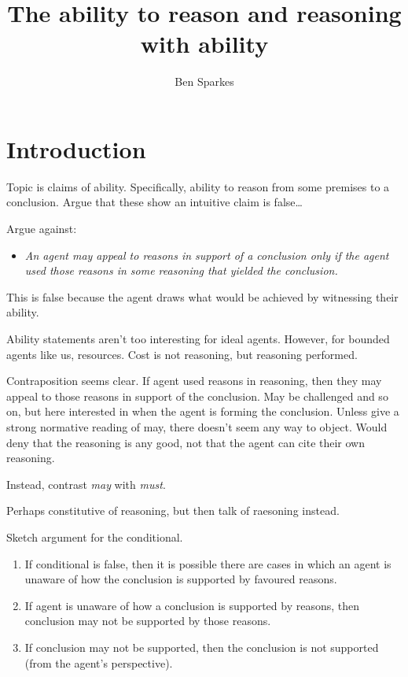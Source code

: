 \documentclass[10pt]{article}
\title{The ability to reason and reasoning with ability}
\author{Ben Sparkes}
\begin{document}
\tableofcontents

\newpage

\maketitle

\section{Introduction}
\label{sec:introduction-1}


{
  \color{red}
  Topic is claims of ability.
  Specifically, ability to reason from some premises to a conclusion.
  Argue that these show an intuitive claim is false\dots
}

Argue against:
\begin{itemize}
\item\label{denied-claim} \emph{An agent may appeal to reasons in support of a conclusion only if the agent used those reasons in some reasoning that yielded the conclusion.}
\end{itemize}

{
  \color{red}
  This is false because the agent draws what would be achieved by witnessing their ability.
}

{
  \color{red}
  Ability statements aren't too interesting for ideal agents.
  However, for bounded agents like us, resources.
  Cost is not reasoning, but reasoning performed.
}

Contraposition seems clear.
If agent used reasons in reasoning, then they may appeal to those reasons in support of the conclusion.
May be challenged and so on, but here interested in when the agent is forming the conclusion.
Unless give a strong normative reading of may, there doesn't seem any way to object.
Would deny that the reasoning is any good, not that the agent can cite their own reasoning.

Instead, contrast \emph{may} with \emph{must}.

Perhaps constitutive of reasoning, but then talk of raesoning instead.

Sketch argument for the conditional.

\begin{enumerate}
\item\label{opp:sketch:1} If conditional is false, then it is possible there are cases in which an agent is unaware of how the conclusion is supported by favoured reasons.
\item\label{opp:sketch:2} If agent is unaware of how a conclusion is supported by reasons, then conclusion may not be supported by those reasons.
\item\label{opp:sketch:3} If conclusion may not be supported, then the conclusion is not supported (from the agent's perspective).
\end{enumerate}
\end{document}
